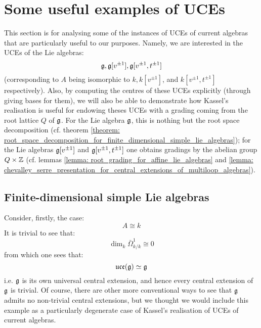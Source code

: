 \section{Some useful examples of UCEs}
    This section is for analysing some of the instances of UCEs of current algebras that are particularly useful to our purposes. Namely, we are interested in the UCEs of the Lie algebras:
        $$\mathfrak{g}, \mathfrak{g}[v^{\pm 1}], \mathfrak{g}[v^{\pm 1}, t^{\pm 1}]$$
    (corresponding to $A$ being isomorphic to $k, k[v^{\pm 1}]$, and $k[v^{\pm 1}, t^{\pm 1}]$ respectively). Also, by computing the centres of these UCEs explicitly (through giving bases for them), we will also be able to demonstrate how Kassel's realisation is useful for endowing theses UCEs with a grading coming from the root lattice $Q$ of $\mathfrak{g}$. For the Lie algebra $\mathfrak{g}$, this is nothing but the root space decomposition (cf. theorem \ref{theorem: root_space_decomposition_for_finite_dimensional_simple_lie_algebras}); for the Lie algebras $\mathfrak{g}[v^{\pm 1}]$ and $\mathfrak{g}[v^{\pm 1}, t^{\pm 1}]$ one obtains gradings by the abelian group $Q \x \Z$ (cf. lemmas \ref{lemma: root_grading_for_affine_lie_algebras} and \ref{lemma: chevalley_serre_presentation_for_central_extensions_of_multiloop_algebras}).

    \subsection{Finite-dimensional simple Lie algebras}
        Consider, firstly, the case:
            $$A \cong k$$
        It is trivial to see that:
            $$\dim_k \bar{\Omega}^1_{k/k} \cong 0$$
        from which one sees that:
            $$\mathfrak{uce}(\mathfrak{g}) \simeq \mathfrak{g}$$
        i.e. $\mathfrak{g}$ is its own universal central extension, and hence every central extension of $\mathfrak{g}$ is trivial. Of course, there are other more conventional ways to see that $\mathfrak{g}$ admits no non-trivial central extensions, but we thought we would include this example as a particularly degenerate case of Kassel's realisation of UCEs of current algebras.

